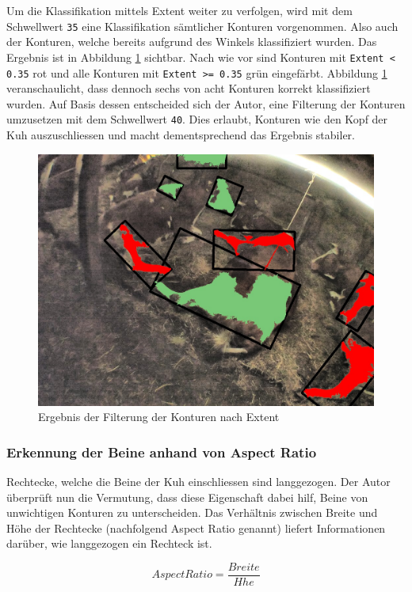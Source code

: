 Um die Klassifikation mittels Extent weiter zu verfolgen, wird mit dem Schwellwert \texttt{35} eine Klassifikation sämtlicher Konturen vorgenommen. Also auch der Konturen, welche bereits aufgrund des Winkels klassifiziert wurden. Das Ergebnis ist in Abbildung \ref{fig: Ergebnis der Filterung der Konturen nach Extent} sichtbar. Nach wie vor sind Konturen mit \texttt{Extent < 0.35} rot und alle Konturen mit \texttt{Extent >= 0.35} grün eingefärbt. Abbildung \ref{fig: Ergebnis der Filterung der Konturen nach Extent} veranschaulicht, dass dennoch sechs von acht Konturen korrekt klassifiziert wurden. Auf Basis dessen entscheided sich der Autor, eine Filterung der Konturen umzusetzen mit dem Schwellwert  \texttt{40}. Dies erlaubt, Konturen wie den Kopf der Kuh auszuschliessen und macht dementsprechend das Ergebnis stabiler.
\begin{figure}[H]
	\center
	\includegraphics[scale=0.43]{Grafiken/entwicklung/26ExtentDemonstration.jpg}
	\caption{Ergebnis der Filterung der Konturen nach Extent } 
	\label{fig: Ergebnis der Filterung der Konturen nach Extent} 
\end{figure}
\subsubsection{Erkennung der Beine anhand von Aspect Ratio}

Rechtecke, welche die Beine der Kuh einschliessen sind langgezogen. Der Autor überprüft nun die Vermutung, dass diese Eigenschaft dabei hilf, Beine von unwichtigen Konturen zu unterscheiden. Das Verhältnis zwischen Breite und Höhe der Rechtecke (nachfolgend Aspect Ratio genannt) liefert Informationen darüber, wie langgezogen ein Rechteck ist.	
	
\begin{equation}\label{Extent}
Aspect Ratio =  \frac{Breite}{H\ddot{}he}  
\end{equation}


